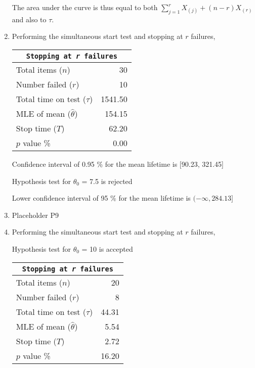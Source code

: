 \begin{enumerate}
	The area under the curve is thus equal to both \(\sum\limits_{j=1}^{r} X_{(j)} + (n-r)X_{(r)} \) and also to \(\tau\).

	\item Performing the simultaneous start test and stopping at \(r\) failures,

		\begin{table}[H]
		\centering
		\begin{tabular}{@{}lr@{}}
		\toprule
		\multicolumn{2}{c}{\texttt{Stopping at \emph{r} failures}} \\
		\midrule
		Total items ($n$)            &       30 \\
		Number failed ($r$)          &       10 \\
		Total time on test ($\tau$)  &  1541.50 \\
		MLE of mean ($\widehat{\theta}$) &   154.15 \\
		Stop time ($T$)              &    62.20 \\
		$p$ value \%                 &     0.00 \\
		\bottomrule
		\end{tabular}
		\end{table}
		\bigskip

		Confidence interval of 0.95 \% for the mean lifetime is [90.23, 321.45]

		Hypothesis test for $\theta_0$ = 7.5 is rejected

		Lower confidence interval of 95 \% for the mean lifetime is \((-\infty, 284.13]\)
		
	\item Placeholder P9
	
	\item Performing the simultaneous start test and stopping at \(r\) failures,
	
		Hypothesis test for $\theta_0$ = 10 is accepted

		\begin{table}[H]
		\centering
		\begin{tabular}{@{}lr@{}}
		\toprule
		\multicolumn{2}{c}{\texttt{Stopping at \emph{r} failures}} \\
		\midrule
		Total items ($n$)            &     20 \\
		Number failed ($r$)          &      8 \\
		Total time on test ($\tau$)  &  44.31 \\
		MLE of mean ($\widehat{\theta}$) &   5.54 \\
		Stop time ($T$)              &   2.72 \\
		$p$ value \%                 &  16.20 \\
		\bottomrule
		\end{tabular}
		\end{table}
		\bigskip


\end{enumerate}
